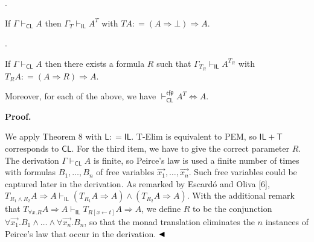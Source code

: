 \documentclass[10pt,a4paper]{article}
\begin{document}
 
 
\par{}. 
 
If $\Gamma\vdash_{\mathsf{CL}}A$ then $\Gamma_{T}\vdash_{\mathsf{IL}}A^{T}$ with $TA\mathrel{\mathop{:}}=(A\mathbin{\Rightarrow}\bot)\mathbin{\Rightarrow}A$.\par
 
 
 
\par{}. 
 
If $\Gamma\vdash_{\mathsf{CL}}A$ then there exists a formula $R$ such that $\Gamma_{T_{R}}\vdash_{\mathsf{IL}}A^{T_{R}}$ with $T_{R}A\mathrel{\mathop{:}}=(A\mathbin{\Rightarrow}R)\mathbin{\Rightarrow}A$.\par
 
 
  
Moreover, for each of the above, we have $\vdash_{\mathsf{CL}}^{\mathfrak{e}\mathfrak{f}\mathfrak{p}}A^{T}\Leftrightarrow
A$.\par
 
 
 
 
\par\medskip\noindent\textbf{Proof.}\par
 
 
We apply Theorem 8 with $\mathsf{L}\mathrel{\mathop{:}}=\mathsf{IL}$. T-Elim is equivalent to PEM, so $\mathsf{IL}+\mathsf{T}$ corresponds to $\mathsf{CL}$. For the third item, we have to give the correct parameter $R$. The derivation $\Gamma\vdash_{\mathsf{CL}}A$ is finite, so Peirce’s law is used a finite number of times with formulas $B_{1},\ldots,B_{n}$ of free variables $\vec{x_{1}},\ldots,\vec{x_{n}}$. Such free variables could be captured later in the derivation. As remarked by Escardó and Oliva [6], $T_{R_{1}\mathbin{\wedge}R_{2}}A\mathbin{\Rightarrow}A\vdash_{\mathsf{IL}}(T_{R_{1}}A\mathbin{\Rightarrow}A)\mathbin{\wedge}(T_{R_{2}}A\mathbin{\Rightarrow}A)$. With the additional remark that $T_{{\forall}x.R}A\mathbin{\Rightarrow}A\vdash_{\mathsf{IL}}T_{R[x\leftarrow t]}A\mathbin{\Rightarrow}A$, we define $R$ to be the conjunction ${\forall}\vec{x_{1}}.B_{1}\mathbin{\wedge}\ldots\mathbin{\wedge}{\forall}\vec{x_{n}}.B_{n}$, so that the monad translation eliminates the $n$ instances of Peirce’s law that occur in the derivation. $\hfill\blacktriangleleft$\par
 
\end{document}
